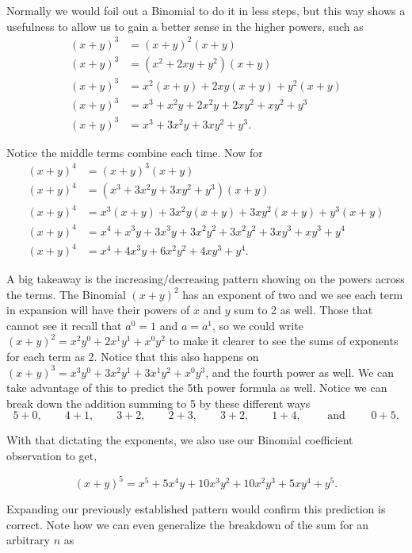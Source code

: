 \documentclass[12pt]{article}
\begin{document}
Normally we would foil out a Binomial to do it in less steps, but this way shows a usefulness to allow us to gain a better sense in the higher powers, such as
\begin{align*}
    (x+y)^3 &= (x+y)^2(x+y) \\
    (x+y)^3 &= (x^2+2xy+y^2)(x+y) \\
    (x+y)^3 &= x^2(x+y)+2xy(x+y)+y^2(x+y) \\
    (x+y)^3 &= x^3+x^2y+2x^2y+2xy^2+xy^2+y^3 \\
    (x+y)^3 &= x^3+3x^2y+3xy^2+y^3.
\end{align*}

Notice the middle terms combine each time. Now for
\begin{align*}
    (x+y)^4 &= (x+y)^3(x+y) \\
    (x+y)^4 &= (x^3+3x^2y+3xy^2+y^3)(x+y) \\
    (x+y)^4 &= x^3(x+y)+3x^2y(x+y)+3xy^2(x+y)+y^3(x+y) \\
    (x+y)^4 &= x^4+x^3y+3x^3y+3x^2y^2+3x^2y^2+3xy^3+xy^3+y^4 \\
    (x+y)^4 &= x^4+4x^3y+6x^2y^2+4xy^3+y^4.
\end{align*}

A big takeaway is the increasing/decreasing pattern showing on the powers across the terms. The Binomial $(x+y)^2$ has an exponent of two and we see each term in expansion will have their powers of $x$ and $y$ sum to 2 as well. Those that cannot see it recall that $a^0=1$ and $a=a^1$, so we could write $(x+y)^2=x^2y^0+2x^1y^1+x^0y^2$ to make it clearer to see the sums of exponents for each term as 2. Notice that this also happens on $(x+y)^3=x^3y^0+3x^2y^1+3x^1y^2+x^0y^3$, and the fourth power as well. We can take advantage of this to predict the 5th power formula as well. Notice we can break down the addition summing to 5 by these different ways
\begin{equation*}
    5+0, \qquad 4+1, \qquad 3+2, \qquad 2+3, \qquad 3+2, \qquad 1+4, \qquad \text{ and } \qquad 0+5.
\end{equation*}

With that dictating the exponents, we also use our Binomial coefficient observation to get,

\begin{equation*}
    (x+y)^5=x^5+5x^4y+10x^3y^2+10x^2y^3+5xy^4+y^5.
\end{equation*}

Expanding our previously established pattern would confirm this prediction is correct. Note how we can even generalize the breakdown of the sum for an arbitrary $n$ as 
\end{document}
